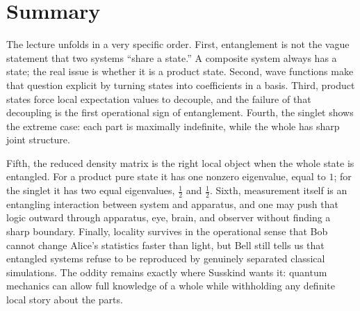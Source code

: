\section{Summary}

The lecture unfolds in a very specific order. First, entanglement is not the vague statement that two systems ``share a state.'' A composite system always has a state; the real issue is whether it is a product state. Second, wave functions make that question explicit by turning states into coefficients in a basis. Third, product states force local expectation values to decouple, and the failure of that decoupling is the first operational sign of entanglement. Fourth, the singlet shows the extreme case: each part is maximally indefinite, while the whole has sharp joint structure.

Fifth, the reduced density matrix is the right local object when the whole state is entangled. For a product pure state it has one nonzero eigenvalue, equal to $1$; for the singlet it has two equal eigenvalues, $\frac12$ and $\frac12$. Sixth, measurement itself is an entangling interaction between system and apparatus, and one may push that logic outward through apparatus, eye, brain, and observer without finding a sharp boundary. Finally, locality survives in the operational sense that Bob cannot change Alice's statistics faster than light, but Bell still tells us that entangled systems refuse to be reproduced by genuinely separated classical simulations. The oddity remains exactly where Susskind wants it: quantum mechanics can allow full knowledge of a whole while withholding any definite local story about the parts.